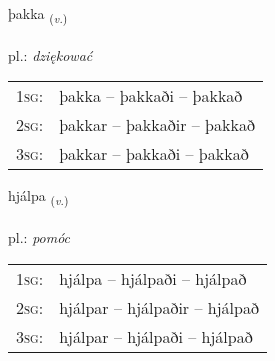 \documentclass[frontgrid, backgrid]{flacards}\usepackage[]{graphicx}\usepackage[]{xcolor}
\begin{document}
\renewcommand{\blhead}{\vskip5pt {\small\bfseries\footnotesize Sagnorð | czasownik }}
\renewcommand{\bcfoot}{\vskip5pt \hspace{2pt}{\small\bfseries\footnotesize 1K}}


{þakka \small{\textsubscript{(\textit{v.})}} \\[1ex] %
\textphonetic{[θahka]} \\
pl.: \emph{dziękować} \\  [2ex]
\renewcommand*{\arraystretch}{0.8}
\begin{tabular}{p{1cm}l}
\textsc{1sg}: & þakka -- þakkaði -- þakkað \\ 
\textsc{2sg}: & þakkar -- þakkaðir -- þakkað \\ 
\textsc{3sg}: & þakkar -- þakkaði -- þakkað \\ 
\end{tabular}
}

\renewcommand{\flhead}{\vskip5pt \fboxsep=0pt {\small\bfseries\footnotesize Sagnorð | czasownik}}
\renewcommand{\fcfoot}{\vskip5pt \fboxsep=0pt \hspace{2pt}{\small\bfseries\footnotesize 1K}}

\renewcommand{\blhead}{\vskip5pt {\small\bfseries\footnotesize Sagnorð | czasownik }}
\renewcommand{\bcfoot}{\vskip5pt \hspace{2pt}{\small\bfseries\footnotesize 1K}}


{hjálpa \small{\textsubscript{(\textit{v.})}} \\[1ex] %
\textphonetic{[çaul̥pa]} \\
pl.: \emph{pomóc} \\  [2ex]
\renewcommand*{\arraystretch}{0.8}
\begin{tabular}{p{1cm}l}
\textsc{1sg}: & hjálpa -- hjálpaði -- hjálpað \\ 
\textsc{2sg}: & hjálpar -- hjálpaðir -- hjálpað \\ 
\textsc{3sg}: & hjálpar -- hjálpaði -- hjálpað \\ 
\end{tabular}
}
\end{document}
